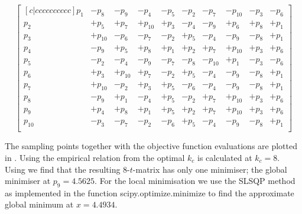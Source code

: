 \begin{equation}
\begin{bmatrix}[c|cccccccccc]
     p_{1}  &  -p_{8}  &  -p_{9}  &  -p_{4}  &  -p_{5}  &  -p_{2}  &  -p_{7}  &  -p_{10}   & -p_{3}  &  -p_{6} \\
     p_{2}  &  +p_{5}  &  +p_{7}  &  +p_{10}  &  +p_{3}  &  -p_{4}  &  -p_{9}  &  +p_{6}   & +p_{8}  &  +p_{1} \\
     p_{3}  &  +p_{10}  &  -p_{6}  &  -p_{7}  &  -p_{2}  &  +p_{5}  &  -p_{4}  &  -p_{9}   & -p_{8}  &  +p_{1} \\
     p_{4}  &  -p_{9}  &  +p_{5}  &  +p_{8}  &  +p_{1}  &  +p_{2}  &  +p_{7}  &  +p_{10}   & +p_{3}  &  +p_{6} \\
     p_{5}  &  -p_{2}  &  -p_{4}  &  -p_{9}  &  -p_{7}  &  -p_{8}  &  -p_{10}  &  +p_{1}   & -p_{3}  &  -p_{6} \\
     p_{6}  &  +p_{3}  &  +p_{10}  &  +p_{7}  &  -p_{2}  &  +p_{5}  &  -p_{4}  &  -p_{9}   & -p_{8}  &  +p_{1} \\
     p_{7}  &  +p_{10}  &  -p_{2}  &  +p_{3}  &  +p_{5}  &  -p_{6}  &  -p_{4}  &  -p_{9}   & -p_{8}  &  +p_{1} \\
     p_{8}  &  -p_{9}  &  +p_{1}  &  -p_{4}  &  +p_{5}  &  -p_{2}  &  +p_{7}  &  +p_{10}   & +p_{3}  &  +p_{6} \\
     p_{9}  &  +p_{4}  &  +p_{8}  &  +p_{1}  &  +p_{5}  &  +p_{2}  &  +p_{7}  &  +p_{10}   & +p_{3}  &  +p_{6} \\
    p_{10}  &  -p_{3}  &  -p_{7}  &  -p_{2}  &  -p_{6}  &  +p_{5}  &  -p_{4}  &  -p_{9}    &-p_{8}  &  +p_{1} \\
\end{bmatrix}
\end{equation}

The sampling points together with the objective function evaluations are plotted in . Using the empirical relation from \citet{Henderson2015} the optimal $k_c$ is calculated at $k_c = 8$. Using  we find that the resulting $8$-$t$-matrix has only one minimiser; the global minimiser at $p_{9} = 4.5625$. For the local minimisation we use the SLSQP method as implemented in the function scipy.optimize.minimize \citep{scipy} to find the approximate global minimum at $x = 4.4934$. 


